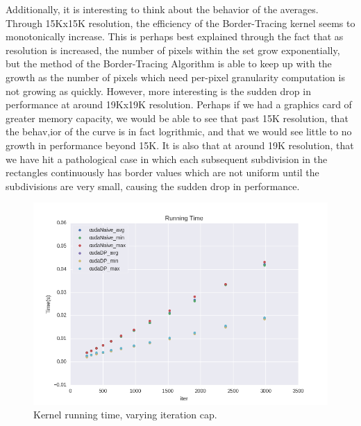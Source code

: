 \documentclass[letterpaper]{article}
\begin{document}
\begin{multicols}{2}
Additionally, it is interesting to think about the behavior of the averages.
  Through 15Kx15K resolution, the efficiency of the Border-Tracing kernel seems
  to monotonically increase. This is perhaps best explained through the fact
  that as resolution is increased, the number of pixels within the set grow
  exponentially, but the method of the Border-Tracing Algorithm is able to keep
  up with the growth as the number of pixels which need per-pixel granularity
  computation is not growing as quickly. 
However, more interesting is the sudden drop in performance at around 19Kx19K
  resolution. Perhaps if we had a graphics card of greater memory capacity, we
  would be able to see that past 15K resolution, that the behav,ior of the curve
  is in fact logrithmic, and that we would see little to no growth in
  performance beyond 15K. 
It is also that at around 19K resolution, that we have hit a pathological case
  in which each subsequent subdivision in the rectangles continuously has border
  values which are not uniform until the subdivisions are very small, causing
  the sudden drop in performance.

\begin{figure}[H]
  \includegraphics[width=\linewidth]{../experiments3/running_time_graph_exp_iter.png}
  \caption{Kernel running time, varying iteration cap.}
  \label{fig:rtIter}
\end{figure}


\end{multicols}
\end{document}
